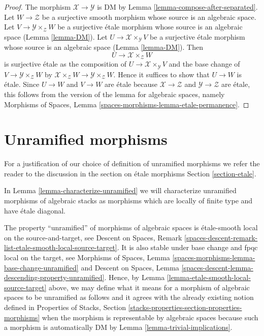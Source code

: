 \documentclass{stacks-project}
\theoremstyle{plain}
\theoremstyle{definition}
\theoremstyle{remark}
\numberwithin{equation}{subsection}
\begin{document}
\begin{proof}
The morphism $\mathcal{X} \to \mathcal{Y}$ is DM by
Lemma \ref{lemma-compose-after-separated}.
Let $W \to \mathcal{Z}$ be a surjective smooth morphism
whose source is an algebraic space. Let
$V \to \mathcal{Y} \times_\mathcal{Z} W$ be a surjective
\'etale morphism whose source is an algebraic space
(Lemma \ref{lemma-DM}).
Let $U \to \mathcal{X} \times_\mathcal{Y} V$ be a surjective
\'etale morphism whose source is an algebraic space
(Lemma \ref{lemma-DM}).
Then
$$
U \longrightarrow \mathcal{X} \times_\mathcal{Z} W
$$
is surjective \'etale as the composition of
$U \to \mathcal{X} \times_\mathcal{Y} V$
and the base change of $V \to \mathcal{Y} \times_\mathcal{Z} W$
by $\mathcal{X} \times_\mathcal{Z} W \to \mathcal{Y} \times_\mathcal{Z} W$.
Hence it suffices to show that $U \to W$ is \'etale.
Since $U \to W$ and $V \to W$ are \'etale because
$\mathcal{X} \to \mathcal{Z}$ and $\mathcal{Y} \to \mathcal{Z}$
are \'etale, this follows from the version of the lemma for
algebraic spaces, namely
Morphisms of Spaces, Lemma \ref{spaces-morphisms-lemma-etale-permanence}.
\end{proof}








\section{Unramified morphisms}
\label{section-unramified}

\noindent
For a justification of our choice of definition of
unramified morphisms we refer the reader to the discussion
in the section on \'etale morphisms Section \ref{section-etale}.

\medskip\noindent
In Lemma \ref{lemma-characterize-unramified} we will characterize
unramified morphisms of algebraic stacks as morphisms which are
locally of finite type and have \'etale diagonal.

\medskip\noindent
The property ``unramified'' of morphisms of algebraic spaces
is \'etale-smooth local on the source-and-target, see
Descent on Spaces, Remark
\ref{spaces-descent-remark-list-etale-smooth-local-source-target}.
It is also stable under base change and fpqc local on the target, see
Morphisms of Spaces,
Lemma \ref{spaces-morphisms-lemma-base-change-unramified}
and
Descent on Spaces,
Lemma \ref{spaces-descent-lemma-descending-property-unramified}.
Hence, by
Lemma \ref{lemma-etale-smooth-local-source-target}
above, we may define what it means for a morphism of algebraic spaces
to be unramified as follows and it agrees with the already existing notion
defined in Properties of Stacks, Section
\ref{stacks-properties-section-properties-morphisms}
when the morphism is representable by algebraic spaces
because such a morphism is automatically DM by
Lemma \ref{lemma-trivial-implications}.
\end{document}

